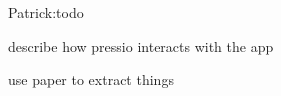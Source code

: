 Patrick\+:todo
\begin{DoxyItemize}
\item describe how pressio interacts with the app
\item use paper to extract things 
\end{DoxyItemize}